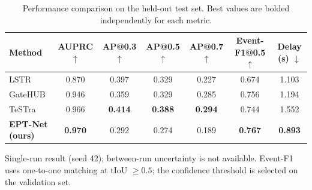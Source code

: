 \begin{table}[t]
\caption{Performance comparison on the held-out test set. Best values are bolded independently for each metric.}
\label{tab:main-performance}
\centering
\setlength{\tabcolsep}{4.2pt}
\renewcommand{\arraystretch}{1.08}
\begin{tabular}{lcccccc}
\toprule
Method & AUPRC $\uparrow$ & AP@0.3 $\uparrow$ & AP@0.5 $\uparrow$ & AP@0.7 $\uparrow$ & Event-F1@0.5 $\uparrow$ & Delay (s) $\downarrow$ \\
\midrule
LSTR & 0.870 & 0.397 & 0.329 & 0.227 & 0.674 & 1.103 \\
GateHUB & 0.946 & 0.359 & 0.329 & 0.285 & 0.756 & 1.194 \\
TeSTra & 0.966 & \textbf{0.414} & \textbf{0.388} & \textbf{0.294} & 0.744 & 1.552 \\
\textbf{EPT-Net (ours)} & \textbf{0.970} & 0.292 & 0.274 & 0.189 & \textbf{0.767} & \textbf{0.893} \\
\bottomrule
\end{tabular}
\vspace{1mm}
\parbox{0.98\textwidth}{\footnotesize Single-run result (seed 42); between-run uncertainty is not available. Event-F1 uses one-to-one matching at tIoU $\geq 0.5$; the confidence threshold is selected on the validation set.}
\end{table}
